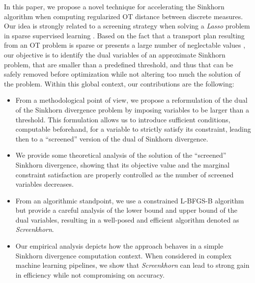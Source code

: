 {In this paper, we propose a novel technique for accelerating the Sinkhorn algorithm when computing regularized OT distance between discrete measures. Our idea
is strongly related to a screening strategy when solving a \emph{Lasso}
problem in sparse supervised learning \citep{Ghaoui2010SafeFE}. Based on the fact
that a  transport plan resulting from an OT problem is sparse or presents a large
number of neglectable values \citep{blondel2018ICML}, our objective is to identify the  dual variables of an approximate Sinkhorn problem, that are smaller than a predefined threshold, and thus that can be safely removed before optimization while not altering too much the solution of the problem.  
Within this global context, our contributions are the following:
\begin{itemize}
	  \setlength\itemsep{-0.1cm}
	
	\item From a methodological point of view, we propose a reformulation of the dual of the Sinkhorn divergence problem by imposing variables to be larger than a threshold.
	This formulation allows us to introduce sufficient conditions, computable beforehand, for a variable to  strictly satisfy its constraint, leading then to
	a ``screened'' version of the dual of Sinkhorn divergence. 
	\item We provide some theoretical analysis of the solution of the ``screened''  Sinkhorn divergence, showing that its objective value and the marginal constraint satisfaction are properly controlled 	as the number of screened variables decreases.
	\item From an algorithmic standpoint, we use a constrained L-BFGS-B algorithm \citep{nocedal1980,byrd1995L-BFGS-B} but provide a careful analysis of the lower bound and upper bound of the dual	variables, resulting in a well-posed and efficient algorithm denoted as \emph{Screenkhorn}.
	\item Our empirical analysis depicts how the approach behaves in a simple Sinkhorn divergence computation context. When considered in  complex machine learning
	pipelines, we show that \emph{Screenkhorn} can lead to strong gain in efficiency
	while not compromising on accuracy.
\end{itemize}}
%	
%

